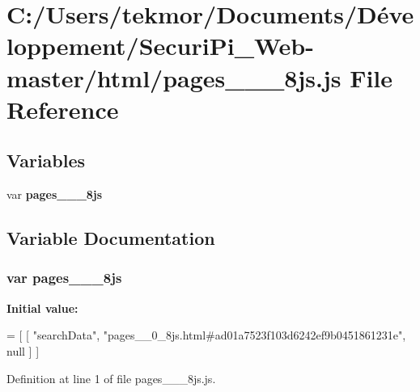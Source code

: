 \section{C\+:/\+Users/tekmor/\+Documents/\+Développement/\+Securi\+Pi\+\_\+\+Web-\/master/html/pages\+\_\+\+\_\+\_\+8js.js File Reference}
\label{pages____0__8js_8js}
\subsection*{Variables}
\begin{DoxyCompactItemize}
\item 
var {\bf pages\+\_\+\+\_\+\_\+8js}
\end{DoxyCompactItemize}


\subsection{Variable Documentation}
\subsubsection[{pages\+\_\+\+\_\+0\+\_\+8js}]{\setlength{\rightskip}{0pt plus 5cm}var pages\+\_\+\+\_\+\_\+8js}\label{pages____0__8js_8js_a78020f0f63b4b38d651e79555fb29660}
{\bfseries Initial value\+:}
\begin{DoxyCode}
=
[
    [ \textcolor{stringliteral}{"searchData"}, \textcolor{stringliteral}{"pages\_\_0\_8js.html#ad01a7523f103d6242ef9b0451861231e"}, null ]
]
\end{DoxyCode}


Definition at line 1 of file pages\+\_\+\+\_\+\_\+8js.\+js.

